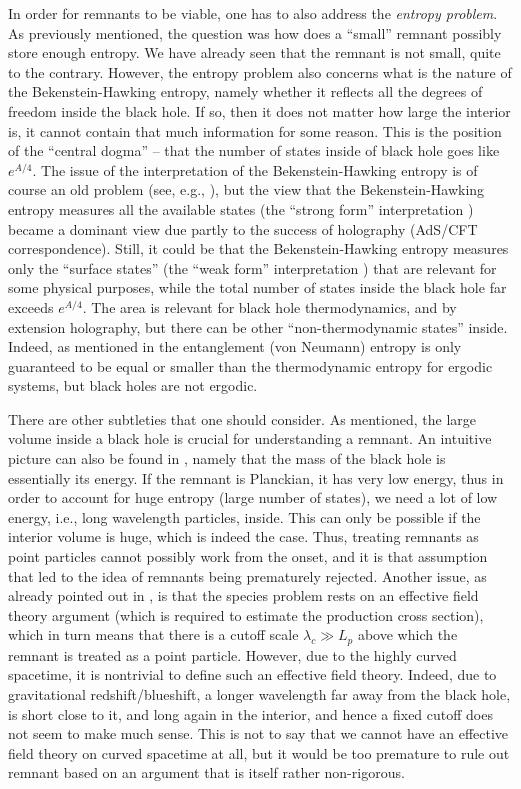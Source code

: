 \documentclass[preprintnumbers, floatfix, preprintnumbers, letterpaper, twocolumn, superscriptaddress,nofootinbib]{revtex4-2}
\begin{document}
In order for remnants to be viable, one has to also address the \emph{entropy problem}. As previously mentioned, the question was how does a ``small'' remnant possibly store enough entropy. We have already seen that the remnant is not small, quite to the contrary. However, the entropy problem also concerns what is the nature of the Bekenstein-Hawking entropy, namely whether it reflects all the degrees of freedom inside the black hole. If so, then it does not matter how large the interior is, it cannot contain that much information for some reason. This is the position of the ``central dogma'' -- that the number of states inside of black hole goes like $e^{A/4}$. The issue of the interpretation of the Bekenstein-Hawking entropy is of course an old problem (see, e.g., \cite{0501103}), but the view that the Bekenstein-Hawking entropy measures all the available states (the ``strong form'' interpretation \cite{0901.3156}) became a dominant view due partly to the success of holography (AdS/CFT correspondence). Still, it could be that the Bekenstein-Hawking entropy measures only the ``surface states'' (the ``weak form'' interpretation \cite{0901.3156}) that are relevant for some physical purposes, while the total number of states inside the black hole far exceeds $e^{A/4}$. The area is relevant for black hole thermodynamics, and by extension holography, but there can be other ``non-thermodynamic states'' inside.
Indeed, as mentioned in \cite{2407.09584} the entanglement (von Neumann) entropy is only guaranteed to be equal or smaller than the thermodynamic entropy for ergodic systems, but black holes are not ergodic. 

There are other subtleties that one should consider. As mentioned, the large volume inside a black hole is crucial for understanding a remnant. An intuitive picture can also be found in \cite{2407.09584}, namely that the mass of the black hole is essentially its energy. If the remnant is Planckian, it has very low energy, thus in order to account for huge entropy (large number of states), we need a lot of low energy, i.e., long wavelength particles, inside. This can only be possible if the interior volume is huge, which is indeed the case. Thus, treating remnants as point particles cannot possibly work from the onset, and it is that assumption that led to the idea of remnants being prematurely rejected. Another issue, as already pointed out in \cite{0901.3156}, is that the species problem rests on an effective field theory argument (which is required to estimate the production cross section), which in turn means that there is a cutoff scale $\lambda_c \gg L_p$ above which the remnant is treated as a point particle. However, due to the highly curved spacetime, it is nontrivial to define such an effective field theory. Indeed, due to gravitational redshift/blueshift, a longer wavelength far away from the black hole, is short close to it, and long again in the interior, and hence a fixed cutoff does not seem to make much sense. This is not to say that we cannot have an effective field theory on curved spacetime at all, but it would be too premature to rule out remnant based on an argument that is itself rather non-rigorous. 
\end{document}
